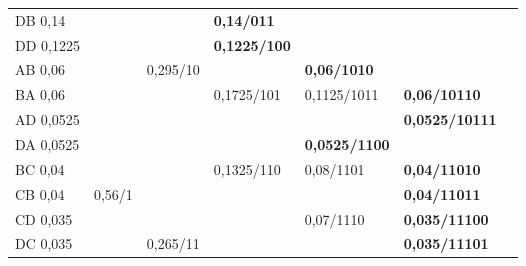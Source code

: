 \documentclass[12pt]{article}
\begin{document}
\begin{enumerate}
\begin{tabular}{|l|l|l|llll}
DB 0,14   &        &                  & \multicolumn{1}{l|}{\textbf{0,14/011}}   &                                           &                                            &                                             \\ \cline{1-4}
DD 0,1225 &        & \textbf{}        & \multicolumn{1}{l|}{\textbf{0,1225/100}} &                                           &                                            &                                             \\ \cline{1-1} \cline{4-5}
AB 0,06   &        & 0,295/10         & \multicolumn{1}{l|}{}                    & \multicolumn{1}{l|}{\textbf{0,06/1010}}   &                                            &                                             \\ \cline{1-1} \cline{5-6}
BA 0,06   &        &                  & \multicolumn{1}{l|}{0,1725/101}          & \multicolumn{1}{l|}{0,1125/1011}          & \multicolumn{1}{l|}{\textbf{0,06/10110}}   &                                             \\ \cline{1-1}
AD 0,0525 &        &                  & \multicolumn{1}{l|}{}                    & \multicolumn{1}{l|}{}                     & \multicolumn{1}{l|}{\textbf{0,0525/10111}} &                                             \\ \cline{1-1} \cline{3-6}
DA 0,0525 &        &                  & \multicolumn{1}{l|}{}                    & \multicolumn{1}{l|}{\textbf{0,0525/1100}} &                                            &                                             \\ \cline{1-1} \cline{5-6}
BC 0,04   &        &                  & \multicolumn{1}{l|}{0,1325/110}          & \multicolumn{1}{l|}{0,08/1101}            & \multicolumn{1}{l|}{\textbf{0,04/11010}}   &                                             \\ \cline{1-1} \cline{6-6}
CB 0,04   & 0,56/1 &                  & \multicolumn{1}{l|}{}                    & \multicolumn{1}{l|}{}                     & \multicolumn{1}{l|}{\textbf{0,04/11011}}   &                                             \\ \cline{1-1} \cline{4-6}
CD 0,035  &        &                  & \multicolumn{1}{l|}{}                    & \multicolumn{1}{l|}{0,07/1110}            & \multicolumn{1}{l|}{\textbf{0,035/11100}}  &                                             \\ \cline{1-1} \cline{6-6}
DC 0,035  &        & 0,265/11         & \multicolumn{1}{l|}{}                    & \multicolumn{1}{l|}{}                     & \multicolumn{1}{l|}{\textbf{0,035/11101}}  &                                             \\ \cline{1-1} \cline{5-7} 

\end{tabular}
\end{enumerate}
\end{document}
